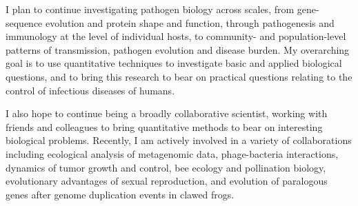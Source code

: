 \documentclass[12pt,a4paper]{article}
\begin{document}
I plan to continue investigating pathogen biology across scales, from gene-sequence evolution and protein shape and function, through pathogenesis and immunology at the level of individual hosts, to community- and population-level patterns of transmission, pathogen evolution and disease burden.  My overarching goal is to use quantitative techniques to investigate basic and applied biological questions, and to bring this research to bear on practical questions relating to the control of infectious diseases of humans.

I also hope to continue being a broadly collaborative scientist, working with friends and colleagues to bring quantitative methods to bear on interesting biological problems.  Recently, I am actively involved in a variety of collaborations including ecological analysis of metagenomic data, phage-bacteria interactions, dynamics of tumor growth and control, bee ecology and pollination biology, evolutionary advantages of sexual reproduction, and evolution of paralogous genes after genome duplication events in clawed frogs.
\end{document}
